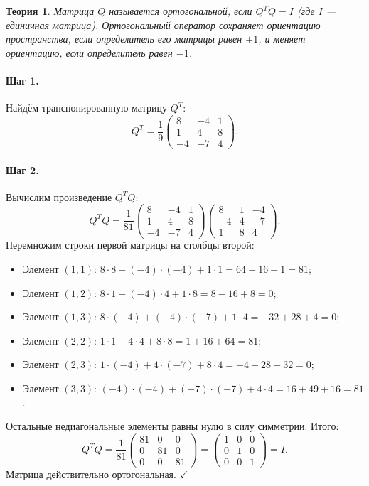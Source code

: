 \documentclass[12pt,a4paper]{article}
\theoremstyle{solution}
\newtheorem*{theory}{Теория}
\newcommand{\step}[1]{\paragraph{Шаг #1.}}
\begin{document}
\begin{theory}
Матрица $Q$ называется ортогональной, если $Q^T Q = I$ (где $I$ — единичная матрица). Ортогональный оператор сохраняет ориентацию пространства, если определитель его матрицы равен $+1$, и меняет ориентацию, если определитель равен $-1$.
\end{theory}

\step{1} Найдём транспонированную матрицу $Q^T$:
\[
Q^T = \frac{1}{9} \begin{pmatrix} 8 & -4 & 1 \\ 1 & 4 & 8 \\ -4 & -7 & 4 \end{pmatrix}.
\]

\step{2} Вычислим произведение $Q^T Q$:
\[
Q^T Q = \frac{1}{81} \begin{pmatrix} 8 & -4 & 1 \\ 1 & 4 & 8 \\ -4 & -7 & 4 \end{pmatrix} \begin{pmatrix} 8 & 1 & -4 \\ -4 & 4 & -7 \\ 1 & 8 & 4 \end{pmatrix}.
\]
Перемножим строки первой матрицы на столбцы второй:
\begin{itemize}
    \item Элемент $(1, 1)$: $8\cdot 8 + (-4)\cdot(-4) + 1\cdot 1 = 64 + 16 + 1 = 81$;
    \item Элемент $(1, 2)$: $8\cdot 1 + (-4)\cdot 4 + 1\cdot 8 = 8 - 16 + 8 = 0$;
    \item Элемент $(1, 3)$: $8\cdot(-4) + (-4)\cdot(-7) + 1\cdot 4 = -32 + 28 + 4 = 0$;
    \item Элемент $(2, 2)$: $1\cdot 1 + 4\cdot 4 + 8\cdot 8 = 1 + 16 + 64 = 81$;
    \item Элемент $(2, 3)$: $1\cdot(-4) + 4\cdot(-7) + 8\cdot 4 = -4 - 28 + 32 = 0$;
    \item Элемент $(3, 3)$: $(-4)\cdot(-4) + (-7)\cdot(-7) + 4\cdot 4 = 16 + 49 + 16 = 81$.
\end{itemize}
Остальные недиагональные элементы равны нулю в силу симметрии. Итого:
\[
Q^T Q = \frac{1}{81} \begin{pmatrix} 81 & 0 & 0 \\ 0 & 81 & 0 \\ 0 & 0 & 81 \end{pmatrix} = \begin{pmatrix} 1 & 0 & 0 \\ 0 & 1 & 0 \\ 0 & 0 & 1 \end{pmatrix} = I.
\]
Матрица действительно ортогональная. \quad$\checkmark$
\end{document}
